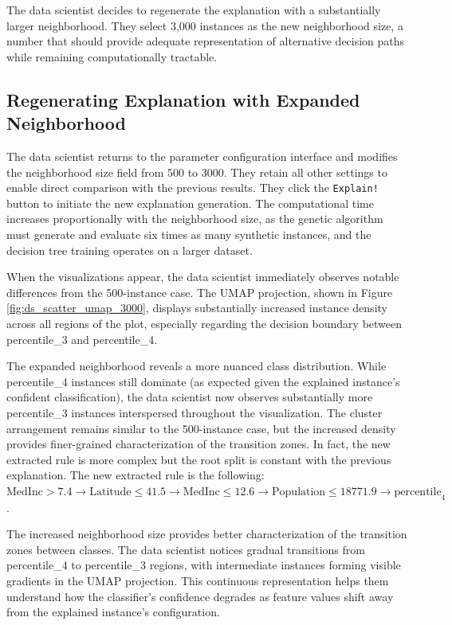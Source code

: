 The data scientist decides to regenerate the explanation with a substantially larger neighborhood. They select 3,000 instances as the new neighborhood size, a number that should provide adequate representation of alternative decision paths while remaining computationally tractable.

\subsection{Regenerating Explanation with Expanded Neighborhood}

The data scientist returns to the parameter configuration interface and modifies the neighborhood size field from 500 to 3000. They retain all other settings to enable direct comparison with the previous results. They click the \texttt{Explain!} button to initiate the new explanation generation. The computational time increases proportionally with the neighborhood size, as the genetic algorithm must generate and evaluate six times as many synthetic instances, and the decision tree training operates on a larger dataset.

When the visualizations appear, the data scientist immediately observes notable differences from the 500-instance case. The UMAP projection, shown in Figure \ref{fig:ds_scatter_umap_3000}, displays substantially increased instance density across all regions of the plot, especially regarding the decision boundary between percentile\_3 and percentile\_4.

The expanded neighborhood reveals a more nuanced class distribution. While percentile\_4 instances still dominate (as expected given the explained instance's confident classification), the data scientist now observes substantially more percentile\_3 instances interspersed throughout the visualization. The cluster arrangement remains similar to the 500-instance case, but the increased density provides finer-grained characterization of the transition zones. In fact, the new extracted rule is more complex but the root split is constant with the previous explanation. The new extracted rule is the following: $\text{MedInc} > 7.4 \rightarrow \text{Latitude} \leq 41.5 \rightarrow \text{MedInc} \leq 12.6 \rightarrow \text{Population} \leq 18771.9 \rightarrow \text{percentile}_4$.

The increased neighborhood size provides better characterization of the transition zones between classes. The data scientist notices gradual transitions from percentile\_4 to percentile\_3 regions, with intermediate instances forming visible gradients in the UMAP projection. This continuous representation helps them understand how the classifier's confidence degrades as feature values shift away from the explained instance's configuration.

